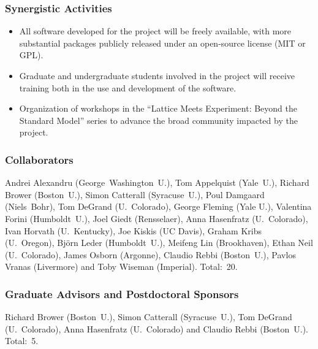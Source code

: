 \documentclass[12 pt]{article}
\begin{document}
\subsubsection*{Synergistic Activities} %
\vspace{-12 pt}
\begin{itemize}
  \item All software developed for the project will be freely available, with more substantial packages publicly released under an open-source license (MIT or GPL).
  \item Graduate and undergraduate students involved in the project will receive training both in the use and development of the software.
  \item Organization of workshops in the ``Lattice Meets Experiment: Beyond the Standard Model'' series to advance the broad community impacted by the project.
\end{itemize}

\subsubsection*{Collaborators} %
\vspace{-12 pt}
  Andrei Alexandru (George~Washington~U.),
  Tom Appelquist (Yale~U.),
  Richard Brower (Boston~U.),
  Simon Catterall (Syracuse~U.),
  Poul Damgaard (Niels~Bohr),
  Tom DeGrand (U.~Colorado),
  George Fleming (Yale U.),
  Valentina Forini (Humboldt~U.),
  Joel Giedt (Rensselaer),
  Anna Hasenfratz (U.~Colorado),
  Ivan Horvath (U.~Kentucky),
  Joe Kiskis (UC Davis),
  Graham Kribs (U.~Oregon),
  Bj\"orn Leder (Humboldt~U.),
  Meifeng Lin (Brookhaven),
  Ethan Neil (U.~Colorado),
  James Osborn (Argonne),
  Claudio Rebbi (Boston~U.),
  Pavlos Vranas (Livermore) and
  Toby Wiseman (Imperial).
  Total:~20.

\subsubsection*{Graduate Advisors and Postdoctoral Sponsors} %
\vspace{-12 pt}
  Richard Brower (Boston~U.),
  Simon Catterall (Syracuse~U.),
  Tom DeGrand (U.~Colorado),
  Anna Hasenfratz (U.~Colorado) and
  Claudio Rebbi (Boston~U.).
  Total:~5.



\end{document}

